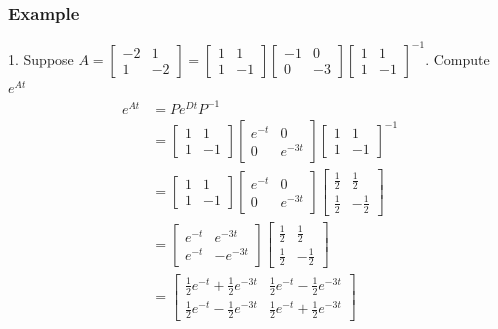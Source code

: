 \begin{enumerate}
\subsubsection{Example}
1. Suppose $A = \begin{bmatrix} -2 & 1 \\ 1 & -2 \end{bmatrix} = 
\begin{bmatrix} 1 & 1 \\ 1 & -1 \end{bmatrix} \begin{bmatrix}
-1 & 0 \\ 0 & -3 \end{bmatrix} \begin{bmatrix} 1 & 1 \\ 1 & -1 
\end{bmatrix}^{-1}$. Compute $e^{At}$
\[
  \begin{aligned}
    e^{At} &= Pe^{Dt}P^{-1} \\   
           &= \begin{bmatrix} 1 & 1 \\ 1 & -1 \end{bmatrix} 
    \begin{bmatrix} e^{-t} & 0 \\ 0 & e^{-3t} \end{bmatrix} 
    \begin{bmatrix} 1 & 1 \\ 1 & -1 \end{bmatrix}^{-1} \\
  &= \begin{bmatrix} 1 & 1 \\ 1 & -1 \end{bmatrix} 
  \begin{bmatrix}e^{-t} & 0 \\ 0 & e^{-3t} \end{bmatrix} 
  \begin{bmatrix} \frac{1}{2} & \frac{1}{2} \\ \frac{1}{2} 
    & -\frac{1}{2} \end{bmatrix} \\
  &= \begin{bmatrix} e^{-t} & e^{-3t} \\ e^{-t} & -e^{-3t} 
    \end{bmatrix} \begin{bmatrix} \frac{1}{2} & \frac{1}{2}
  \\ \frac{1}{2} & -\frac{1}{2} \end{bmatrix} \\
                   &= \begin{bmatrix} \frac{1}{2}e^{-t} 
                     + \frac{1}{2}e^{-3t} & \frac{1}{2}e^{-t} 
                     - \frac{1}{2}e^{-3t} \\ 
                      \frac{1}{2}e^{-t} 
                     - \frac{1}{2}e^{-3t} & \frac{1}{2}e^{-t} 
                   + \frac{1}{2}e^{-3t} \end{bmatrix}
      \end{aligned}
\]

\end{enumerate}

